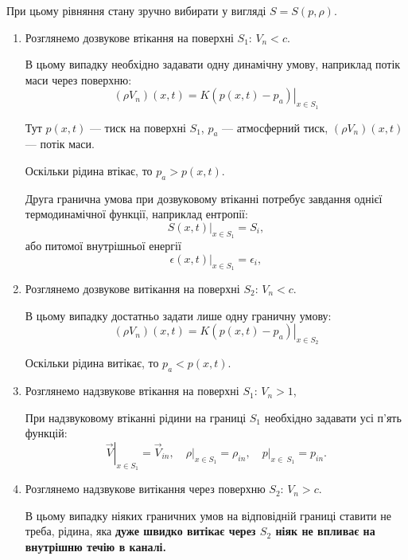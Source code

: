 При цьому рівняння стану зручно вибирати у вигляді $S = S(p, \rho)$.

\begin{enumerate}
	\item Розглянемо дозвукове втікання на поверхні $S_1$: $V_n < c$. \medskip   

	В цьому випадку необхідно задавати одну динамічну умову, наприклад потік маси через поверхню:
	\begin{equation}
		(\rho V_n )(x, t) = K \left. (p(x, t) - p_a) \right|_{x \in S_1}
	\end{equation}

	\begin{remark}
		Тут $p(x, t)$ --- тиск на поверхні $S_1$, $p_a$ --- атмосферний тиск, $(\rho V_n)(x, t)$ --- потік маси.
	\end{remark}

	\begin{remark}
		Оскільки рідина втікає, то $p_a > p(x, t)$.
	\end{remark}

	Друга гранична умова при дозвуковому втіканні потребує завдання однієї термодинамічної функції, наприклад ентропії:
	\begin{equation}
		\left. S(x, t) \right|_{x \in S_1} = S_i,
	\end{equation}
	або питомої внутрішньої енергії
	\begin{equation}
		\left. \epsilon(x, t) \right|_{x \in S_1} = \epsilon_i,
	\end{equation}

	\item Розглянемо дозвукове витікання на поверхні $S_2$: $V_n < c$. \medskip

	В цьому випадку достатньо задати лише одну граничну умову:
	\begin{equation}
		(\rho V_n )(x, t) = K \left. (p(x, t) - p_a) \right|_{x \in S_2}
	\end{equation}

	\begin{remark}
		Оскільки рідина витікає, то $p_a < p(x, t)$.
	\end{remark}

	\item Розглянемо надзвукове втікання на поверхні $S_1$: $V_n > 1$, \medskip

	При надзвуковому втіканні рідини на границі $S_1$ необхідно задавати усі п'ять функцій:
	\begin{equation}
		\left. \vec V \right|_{x \in S_1} = \vec V_{in}, \quad \left. \rho \right|_{x \in S_1} = \rho_{in}, \quad \left. p \right|_{x \in \ S_1} = p_{in}.
	\end{equation}

	\item Розглянемо надзвукове витікання через поверхню $S_2$: $V_n > c$. \medskip

	В цьому випадку ніяких граничних умов на відповідній границі ставити не треба, рідина, яка \bf{дуже швидко} витікає через $S_2$ ніяк не впливає на внутрішню течію в каналі.
\end{enumerate}

